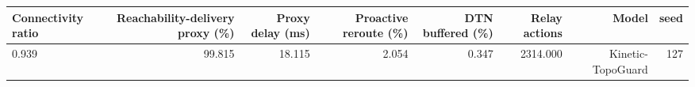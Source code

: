 \begin{tabular}{lrrrrrrr}
\toprule
Connectivity ratio & Reachability-delivery proxy (\%) & Proxy delay (ms) & Proactive reroute (\%) & DTN buffered (\%) & Relay actions & Model & seed \\
\midrule
0.939 & 99.815 & 18.115 & 2.054 & 0.347 & 2314.000 & Kinetic-TopoGuard & 127 \\
\bottomrule
\end{tabular}